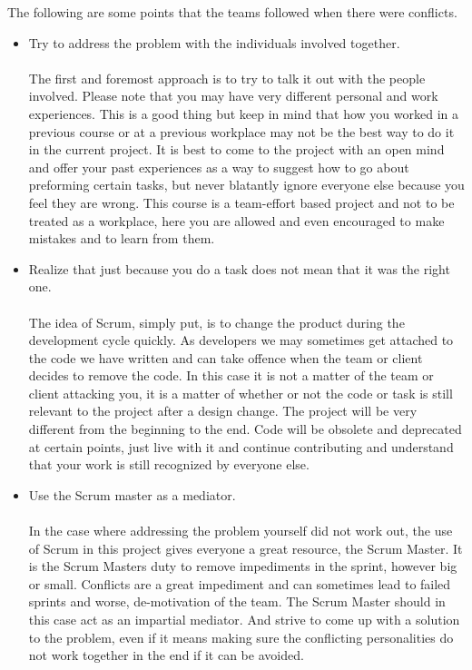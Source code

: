 The following are some points that the teams followed when there were conflicts.
\begin{itemize}
\item Try to address the problem with the individuals involved together.\\ \\
The first and foremost approach is to try to talk it out with the people involved. Please note that you may have very different personal and work experiences. This is a good thing but keep in mind that how you worked in a previous course or at a previous workplace may not be the best way to do it in the current project. It is best to come to the project with an open mind and offer your past experiences as a way to suggest how to go about preforming certain tasks, but never blatantly ignore everyone else because you feel they are wrong. This course is a team-effort based project and not to be treated as a workplace, here you are allowed and even encouraged to make mistakes and to learn from them.

\item Realize that just because you do a task does not mean that it was the right one.\\ \\
The idea of Scrum, simply put, is to change the product during the development cycle quickly. As developers we may sometimes get attached to the code we have written and can take offence when the team or client decides to remove the code. In this case it is not a matter of the team or client attacking you, it is a matter of whether or not the code or task is still relevant to the project after a design change. The project will be very different from the beginning to the end. Code will be obsolete and deprecated at certain points, just live with it and continue contributing and understand that your work is still recognized by everyone else.
 \\
\item Use the Scrum master as a mediator.\\ \\
In the case where addressing the problem yourself did not work out, the use of Scrum in this project gives everyone a great resource, the Scrum Master. It is the Scrum Masters duty to remove impediments in the sprint, however big or small. Conflicts are a great impediment and can sometimes lead to failed sprints and worse, de-motivation of the team. The Scrum Master should in this case act as an impartial mediator. And strive to come up with a solution to the problem, even if it means making sure the conflicting personalities do not work together in the end if it can be avoided.

\end{itemize}
